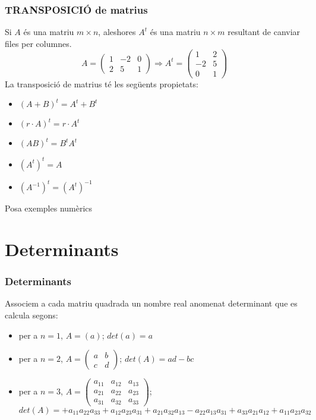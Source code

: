 \documentclass{beamer}
\begin{document}
\begin{frame}
  \frametitle{TRANSPOSICIÓ de matrius}
  Si $A$ és una matriu $m \times n$, aleshores $A^t$ és una matriu $n \times m$ resultant de canviar files per columnes.
  \[
  A= \begin{pmatrix}
  1 & -2 & 0\\
  2 & 5 & 1
\end{pmatrix}
\Rightarrow
A^t= \begin{pmatrix}
1 & 2\\
-2 & 5\\
0 & 1
\end{pmatrix}
  \]
  La transposició de matrius té les següents propietats:
  \begin{itemize}
    \item $(A+B)^t=A^t + B^t$
    \item $(r\cdot A)^t = r \cdot A^t$
    \item $(AB)^t= B^tA^t$
    \item $(A^t)^t =A$
    \item $(A^{-1})^t=(A^t)^{-1}$
  \end{itemize}
  \begin{exercici}{}
    Posa exemples numèrics
  \end{exercici}
\end{frame}

\section{Determinants}
\begin{frame}
  \frametitle{Determinants}
  Associem a cada matriu quadrada un nombre real anomenat determinant que es calcula segons:
  \begin{itemize}
    \item per a $n=1$, $A=(a)$; $det(a)=a$
    \item per a $n=2$, $A=\begin{pmatrix}a& b\\c & d\end{pmatrix}$; $det(A)= ad -bc$
    \item per a $n=3$, $A=\begin{pmatrix}a_{11}&a_{12}&a_{13}\\a_{21}&a_{22}&a_{23}\\a_{31}&a_{32}&a_{33}\end{pmatrix}$; $det(A)= +a_{11}a_{22}a_{33}+a_{12}a_{23}a_{31}+a_{21}a_{32}a_{13}-a_{22}a_{13}a_{31}+a_{33}a_{21}a_{12}+a_{11}a_{23}a_{32}$
  \end{itemize}
\end{frame}
\end{document}
